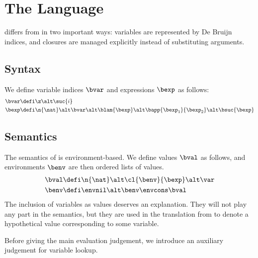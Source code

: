 \section{The \textnormal{\blang} Language}

\blang differs from \hlang in two important ways: variables are represented by De Bruijn indices, and closures are managed explicitly instead of substituting arguments.

\subsection{Syntax}

We define variable indices $\bvar$ and \blang expressions $\bexp$ as follows:
\begin{align*}
	\bvar &\defi \z \alt \suc{i} \\
	\bexp &\defi \n{\nat} \alt \bvar \alt \blam{\bexp} \alt \bapp{\bexp_1}{\bexp_2} \alt \bsuc{\bexp} \\
\end{align*}

\subsection{Semantics}

The semantics of \blang is environment-based.
We define \blang values $\bval$ as follows, and environments $\benv$ are then ordered lists of values.
\begin{align*}
  \bval &\defi \n{\nat} \alt \cl{\benv}{\bexp} \alt \var \\
  \benv &\defi \envnil \alt \benv \envcons \bval \\
\end{align*}
The inclusion of variables as \blang values deserves an explanation.
They will not play any part in the semantics, but they are used in the translation from \hlang to denote a hypothetical value corresponding to some variable.
%
%

Before giving the main evaluation judgement, we introduce an auxiliary judgement for variable lookup.

\vspace{0.5cm}

\judgement{\blook{\benv}{\bvar}{\bval}}

